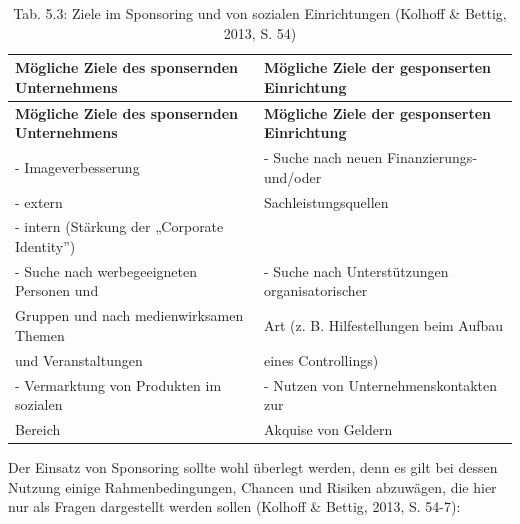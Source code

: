 \documentclass[
  letterpaper,
]{book}
\begin{document}
\begin{longtable}[]{@{}
  >{\raggedright\arraybackslash}p{}
  >{\raggedright\arraybackslash}p{}@{}}
\caption{Tab. 5.3: Ziele im Sponsoring und von sozialen Einrichtungen
(Kolhoff \& Bettig, 2013, S. 54)}\tabularnewline
\toprule\noalign{}
\begin{minipage}[b]{\linewidth}\raggedright
\textbf{Mögliche Ziele des sponsernden Unternehmens}
\end{minipage} & \begin{minipage}[b]{\linewidth}\raggedright
\textbf{Mögliche Ziele der gesponserten Einrichtung}
\end{minipage} \\
\midrule\noalign{}
\endfirsthead
\toprule\noalign{}
\begin{minipage}[b]{\linewidth}\raggedright
\textbf{Mögliche Ziele des sponsernden Unternehmens}
\end{minipage} & \begin{minipage}[b]{\linewidth}\raggedright
\textbf{Mögliche Ziele der gesponserten Einrichtung}
\end{minipage} \\
\midrule\noalign{}
\endhead
\bottomrule\noalign{}
\endlastfoot
- Imageverbesserung & - Suche nach neuen Finanzierungs- und/oder \\
- extern & Sachleistungsquellen \\
- intern (Stärkung der „Corporate Identity'') & \\
- Suche nach werbegeeigneten Personen und & - Suche nach Unterstützungen
organisatorischer \\
Gruppen und nach medienwirksamen Themen & Art (z. B. Hilfestellungen
beim Aufbau \\
und Veranstaltungen & eines Controllings) \\
- Vermarktung von Produkten im sozialen & - Nutzen von
Unternehmenskontakten zur \\
Bereich & Akquise von Geldern \\
\end{longtable}

Der Einsatz von Sponsoring sollte wohl überlegt werden, denn es gilt bei
dessen Nutzung einige Rahmenbedingungen, Chancen und Risiken abzuwägen,
die hier nur als Fragen dargestellt werden sollen (Kolhoff \& Bettig,
2013, S. 54-7):
\end{document}
